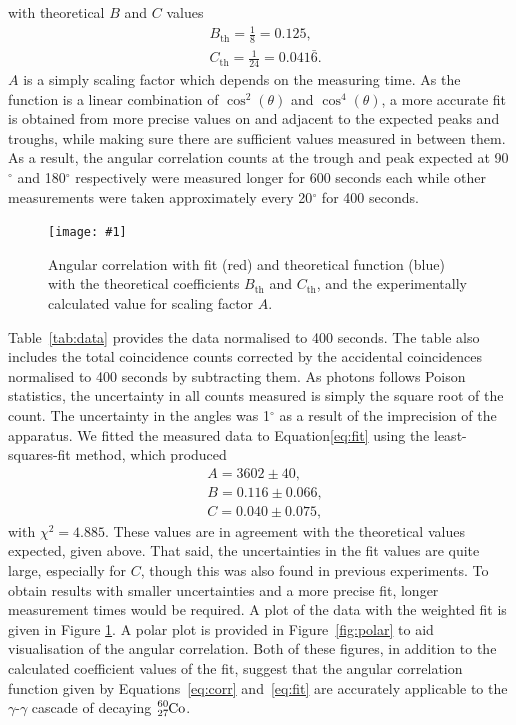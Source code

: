 \documentclass[twocolumn]{article}
\newcommand{\insertFigure}[1]{%
   \texttt{[image: \#1]}%
}
\begin{document}
with theoretical $B$ and $C$ values\cite{sieg}
\begin{align*}
&B_{\text{th}} = \frac{1}{8} = 0.125,\\
&C_{\text{th}} = \frac{1}{24} = 0.041\bar{6}.
\end{align*}
$A$ is a simply scaling factor which depends on the measuring time. As the function is a linear combination of $\cos^2(\theta)$ and $\cos^4(\theta)$, a more accurate fit is obtained from more precise values on and adjacent to the expected peaks and troughs, while making sure there are sufficient values measured in between them. As a result, the angular correlation counts at the trough and peak expected at 90$^{\circ}$ and 180$^{\circ}$ respectively were measured longer for 600 seconds each while other measurements were taken approximately every 20$^{\circ}$ for 400 seconds. 
\begin{figure} [!h]
	\centering
	\insertFigure{angular.png}
	\caption{Angular correlation with fit (red) and theoretical function (blue) with the theoretical coefficients $B_{\text{th}}$ and $C_{\text{th}}$, and the experimentally calculated value for scaling factor $A$.}
	\label{fig:angular}
\end{figure}
Table~\ref{tab:data} provides the data normalised to 400 seconds. The table also includes the total coincidence counts corrected by the accidental coincidences normalised to 400 seconds by subtracting them. As photons follows Poison statistics, the uncertainty in all counts measured is simply the square root of the count. The uncertainty in the angles was 1$^\circ$ as a result of the imprecision of the apparatus. We fitted the measured data to Equation\ref{eq:fit} using the least-squares-fit method, which produced
\begin{align*}
&A = 3602 \pm 40,\\
&B = 0.116  \pm 0.066,\\
&C = 0.040 \pm 0.075,
\end{align*}
with $\chi^2 = 4.885$. These values are in agreement with the theoretical values expected, given above. That said, the uncertainties in the fit values are quite large, especially for $C$, though this was also found in previous experiments.\cite{meliss} To obtain results with smaller uncertainties and a more precise fit, longer measurement times would be required. A plot of the data with the weighted fit is given in Figure \ref{fig:angular}. A polar plot is provided in Figure~\ref{fig:polar} to aid visualisation of the angular correlation. Both of these figures, in addition to the calculated coefficient values of the fit, suggest that the angular correlation function given by Equations~\ref{eq:corr} and~\ref{eq:fit} are accurately applicable to the $\gamma$-$\gamma$ cascade of decaying $\ce{_27^{60}Co}$.
\end{document}

